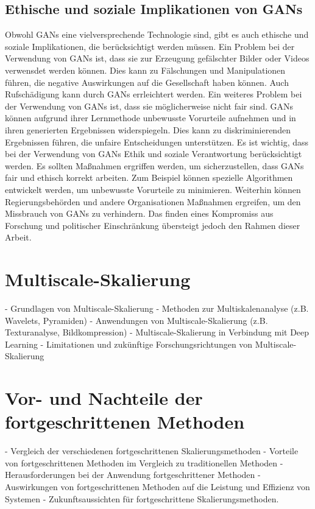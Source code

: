     \subsection{Ethische und soziale Implikationen von GANs}
    
    Obwohl GANs eine vielversprechende Technologie sind, gibt es auch ethische und soziale Implikationen, die berücksichtigt werden müssen. 
    Ein Problem bei der Verwendung von GANs ist, dass sie zur Erzeugung gefälschter Bilder oder Videos verwensdet werden können. 
    Dies kann zu Fälschungen und Manipulationen führen, die negative Auswirkungen auf die Gesellschaft haben können.
    Auch Rufschädigung kann durch GANs errleichtert werden.
    Ein weiteres Problem bei der Verwendung von GANs ist, dass sie möglicherweise nicht fair sind. 
    GANs können aufgrund ihrer Lernmethode unbewusste Vorurteile aufnehmen und in ihren generierten Ergebnissen widerspiegeln. 
    Dies kann zu diskriminierenden Ergebnissen führen, die unfaire Entscheidungen unterstützen.%
    Es ist wichtig, dass bei der Verwendung von GANs Ethik und soziale Verantwortung berücksichtigt werden. 
    Es sollten Maßnahmen ergriffen werden, um sicherzustellen, dass GANs fair und ethisch korrekt arbeiten. 
    Zum Beispiel können spezielle Algorithmen entwickelt werden, um unbewusste Vorurteile zu minimieren. 
    Weiterhin können Regierungsbehörden und andere Organisationen Maßnahmen ergreifen, um den Missbrauch von GANs zu verhindern. 
    Das finden eines Kompromiss aus Forschung und politischer Einschränkung übersteigt jedoch den Rahmen dieser Arbeit. 
    
\section{Multiscale-Skalierung}

- Grundlagen von Multiscale-Skalierung
- Methoden zur Multiskalenanalyse (z.B. Wavelets, Pyramiden)
- Anwendungen von Multiscale-Skalierung (z.B. Texturanalyse, Bildkompression)
- Multiscale-Skalierung in Verbindung mit Deep Learning
- Limitationen und zukünftige Forschungsrichtungen von Multiscale-Skalierung

\section{Vor- und Nachteile der fortgeschrittenen Methoden}

- Vergleich der verschiedenen fortgeschrittenen Skalierungsmethoden
- Vorteile von fortgeschrittenen Methoden im Vergleich zu traditionellen Methoden
- Herausforderungen bei der Anwendung fortgeschrittener Methoden
- Auswirkungen von fortgeschrittenen Methoden auf die Leistung und Effizienz von Systemen
- Zukunftsaussichten für fortgeschrittene Skalierungsmethoden.

\newpage

